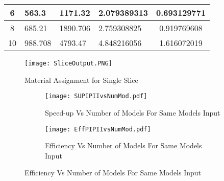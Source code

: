 \begin{table}
\begin{tabular}{|c|l|l|l|c|}
6                                                                                                                            & 563.3                                                                                                                                                                    & 1171.32                                                                                                                                    & 2.079389313                            & 0.693129771         \\ \hline
8                                                                                                                            & 685.21                                                                                                                                                                   & 1890.706                                                                                                                                   & 2.759308825                            & 0.919769608         \\ \hline
10                                                                                                                           & 988.708                                                                                                                                                                  & 4793.47                                                                                                                                    & 4.848216056                            & 1.616072019         \\ \hline
\end{tabular}
\end{table}

\begin{figure}[t]
\centering
\texttt{[image: SliceOutput.PNG]}
\caption{Material Assignment for Single Slice}
\label{fig:SliceOutput}
\end{figure}

\begin{figure}
\centering
\begin{subfigure}
\centering
\captionsetup[subfigure]{labelformat=empty}
\texttt{[image: SUPIPIIvsNumMod.pdf]}
\caption{Speed-up Vs Number of Models For Same Models Input}
\label{fig:SUPIPIIvsNumMod}
\end{subfigure}
\begin{subfigure}
\centering
\texttt{[image: EffPIPIIvsNumMod.pdf]}
\caption{Efficiency Vs Number of Models For Same Models Input}
\label{fig:EffPIPIIvsNumMod}
\end{subfigure}
\end{figure}


